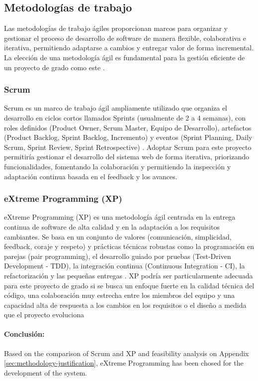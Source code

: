 \subsection{Metodologías de trabajo}
Las metodologías de trabajo ágiles proporcionan marcos para organizar y gestionar el proceso de desarrollo de software de manera flexible, colaborativa e iterativa, permitiendo adaptarse a cambios y entregar valor de forma incremental.
La elección de una metodología ágil es fundamental para la gestión eficiente de un proyecto de grado como este \parencite{Beck2001}.

\subsubsection{Scrum}
Scrum es un marco de trabajo ágil ampliamente utilizado que organiza el desarrollo en ciclos cortos llamados Sprints (usualmente de 2 a 4 semanas), con roles definidos (Product Owner, Scrum Master, Equipo de Desarrollo), artefactos (Product Backlog, Sprint Backlog, Incremento) y eventos (Sprint Planning, Daily Scrum, Sprint Review, Sprint Retrospective) \parencite{SchwaberSutherland2020}.
Adoptar Scrum para este proyecto permitiría gestionar el desarrollo del sistema web de forma iterativa, priorizando funcionalidades, fomentando la colaboración y permitiendo la inspección y adaptación continua basada en el feedback y los avances.

\subsubsection{eXtreme Programming (XP)}
eXtreme Programming (XP) es una metodología ágil centrada en la entrega continua de software de alta calidad y en la adaptación a los requisitos cambiantes.
Se basa en un conjunto de valores (comunicación, simplicidad, feedback, coraje y respeto) y prácticas técnicas robustas como la programación en parejas (pair programming), el desarrollo guiado por pruebas (Test-Driven Development - TDD), la integración continua (Continuous Integration - CI), la refactorización y las pequeñas entregas \parencite{Beck2004}.
XP podría ser particularmente adecuada para este proyecto de grado si se busca un enfoque fuerte en la calidad técnica del código, una colaboración muy estrecha entre los miembros del equipo y una capacidad alta de respuesta a los cambios en los requisitos o el diseño a medida que el proyecto evoluciona

\paragraph{Conclusión:} Based on the comparison of Scrum and XP and feasibility analysis on Appendix \ref{sec:methodology-justification}, eXtreme Programming has been chosed for the development of the system.

